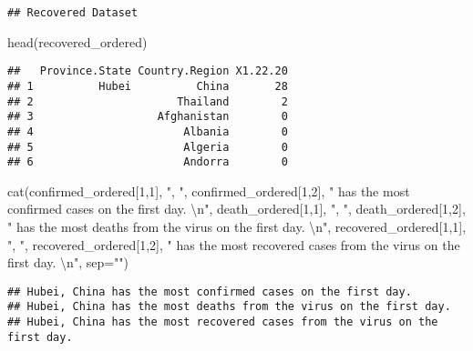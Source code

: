 \documentclass[
]{article}
\newenvironment{Shaded}{\begin{snugshade}}{\end{snugshade}}
\newcommand{\AttributeTok}[1]{\textcolor[rgb]{0.77,0.63,0.00}{#1}}
\newcommand{\DecValTok}[1]{\textcolor[rgb]{0.00,0.00,0.81}{#1}}
\newcommand{\FunctionTok}[1]{\textcolor[rgb]{0.00,0.00,0.00}{#1}}
\newcommand{\NormalTok}[1]{#1}
\newcommand{\SpecialCharTok}[1]{\textcolor[rgb]{0.00,0.00,0.00}{#1}}
\newcommand{\StringTok}[1]{\textcolor[rgb]{0.31,0.60,0.02}{#1}}
\begin{document}
\begin{verbatim}
## Recovered Dataset
\end{verbatim}

\begin{Shaded}
\begin{Highlighting}[]
\FunctionTok{head}\NormalTok{(recovered\_ordered)}
\end{Highlighting}
\end{Shaded}

\begin{verbatim}
##   Province.State Country.Region X1.22.20
## 1          Hubei          China       28
## 2                      Thailand        2
## 3                   Afghanistan        0
## 4                       Albania        0
## 5                       Algeria        0
## 6                       Andorra        0
\end{verbatim}

\begin{Shaded}
\begin{Highlighting}[]
\FunctionTok{cat}\NormalTok{(confirmed\_ordered[}\DecValTok{1}\NormalTok{,}\DecValTok{1}\NormalTok{], }\StringTok{", "}\NormalTok{, confirmed\_ordered[}\DecValTok{1}\NormalTok{,}\DecValTok{2}\NormalTok{], }
    \StringTok{" has the most confirmed cases on the first day. }\SpecialCharTok{\textbackslash{}n}\StringTok{"}\NormalTok{, }
\NormalTok{    death\_ordered[}\DecValTok{1}\NormalTok{,}\DecValTok{1}\NormalTok{], }\StringTok{", "}\NormalTok{, death\_ordered[}\DecValTok{1}\NormalTok{,}\DecValTok{2}\NormalTok{], }
    \StringTok{" has the most deaths from the virus on the first day. }\SpecialCharTok{\textbackslash{}n}\StringTok{"}\NormalTok{,}
\NormalTok{    recovered\_ordered[}\DecValTok{1}\NormalTok{,}\DecValTok{1}\NormalTok{], }\StringTok{", "}\NormalTok{, recovered\_ordered[}\DecValTok{1}\NormalTok{,}\DecValTok{2}\NormalTok{], }
    \StringTok{" has the most recovered cases from the virus on the first day. }\SpecialCharTok{\textbackslash{}n}\StringTok{"}\NormalTok{, }
    \AttributeTok{sep=}\StringTok{""}\NormalTok{)}
\end{Highlighting}
\end{Shaded}

\begin{verbatim}
## Hubei, China has the most confirmed cases on the first day. 
## Hubei, China has the most deaths from the virus on the first day. 
## Hubei, China has the most recovered cases from the virus on the first day.
\end{verbatim}
\end{document}
